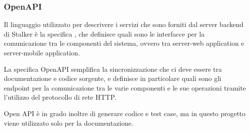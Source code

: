 \documentclass[../../../manuale-sviluppatore.tex]{subfiles}
\begin{document}
\subsubsection{OpenAPI}%
\label{subs:openapi}

Il linguaggio utilizzato per descrivere i servizi che sono forniti dal server backend di Stalker è la specifica , che definisce quali sono le interfacce per la comunicazione tra le componenti del sistema, ovvero tra server-web application e server-mobile application.

La specifica OpenAPI semplifica la sincronizzazione che ci deve essere tra documentazione e codice sorgente, e definisce in particolare quali sono gli endpoint per la comunicazione tra le varie componenti e le sue operazioni tramite l'utilizzo del protocollo di rete HTTP\@.

Open API è in grado inoltre di generare codice e test case, ma in questo progetto viene utilizzato solo per la documentazione.
\end{document}
